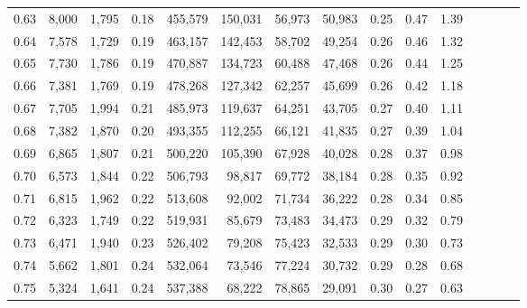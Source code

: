 \begin{tabular}{rrrcrrrrrrrrrrr}
0.63 &   8,000 &  1,795 &                                       0.18 &  455,579 &  150,031 &   56,973 &   50,983 &  0.25 &  0.47 &                         1.39 \\
0.64 &   7,578 &  1,729 &                                       0.19 &  463,157 &  142,453 &   58,702 &   49,254 &  0.26 &  0.46 &                         1.32 \\
0.65 &   7,730 &  1,786 &                                       0.19 &  470,887 &  134,723 &   60,488 &   47,468 &  0.26 &  0.44 &                         1.25 \\
0.66 &   7,381 &  1,769 &                                       0.19 &  478,268 &  127,342 &   62,257 &   45,699 &  0.26 &  0.42 &                         1.18 \\
0.67 &   7,705 &  1,994 &                                       0.21 &  485,973 &  119,637 &   64,251 &   43,705 &  0.27 &  0.40 &                         1.11 \\
0.68 &   7,382 &  1,870 &                                       0.20 &  493,355 &  112,255 &   66,121 &   41,835 &  0.27 &  0.39 &                         1.04 \\
0.69 &   6,865 &  1,807 &                                       0.21 &  500,220 &  105,390 &   67,928 &   40,028 &  0.28 &  0.37 &                         0.98 \\
0.70 &   6,573 &  1,844 &                                       0.22 &  506,793 &   98,817 &   69,772 &   38,184 &  0.28 &  0.35 &                         0.92 \\
0.71 &   6,815 &  1,962 &                                       0.22 &  513,608 &   92,002 &   71,734 &   36,222 &  0.28 &  0.34 &                         0.85 \\
0.72 &   6,323 &  1,749 &                                       0.22 &  519,931 &   85,679 &   73,483 &   34,473 &  0.29 &  0.32 &                         0.79 \\
0.73 &   6,471 &  1,940 &                                       0.23 &  526,402 &   79,208 &   75,423 &   32,533 &  0.29 &  0.30 &                         0.73 \\
0.74 &   5,662 &  1,801 &                                       0.24 &  532,064 &   73,546 &   77,224 &   30,732 &  0.29 &  0.28 &                         0.68 \\
0.75 &   5,324 &  1,641 &                                       0.24 &  537,388 &   68,222 &   78,865 &   29,091 &  0.30 &  0.27 &                         0.63 \\

\end{tabular}
